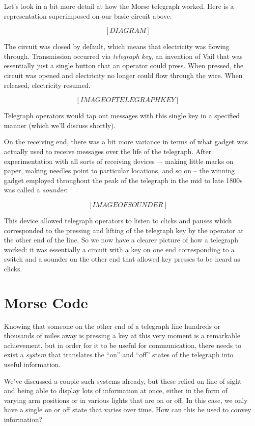 \documentclass{book}
\begin{document}
Let's look in a bit more detail at how the Morse telegraph worked. Here is a representation superimposed on our basic circuit above:

\[ [DIAGRAM] \]

The circuit was closed by default, which means that electricity was flowing through. Transmission occurred via \emph{telegraph key}, an invention of Vail that was essentially just a single button that an operator could press. When pressed, the circuit was opened and electricity no longer could flow through the wire. When released, electricity resumed.

\[ [IMAGE OF TELEGRAPH KEY] \]

Telegraph operators would tap out messages with this single key in a specified manner (which we'll discuss shortly).

On the receiving end, there was a bit more variance in terms of what gadget was actually used to receive messages over the life of the telegraph. After experimentation with all sorts of receiving devices –- making little marks on paper, making needles point to particular locations, and so on -- the winning gadget employed throughout the peak of the telegraph in the mid to late 1800s was called a \emph{sounder}:

\[ [IMAGE OF SOUNDER] \]

This device allowed telegraph operators to listen to clicks and pauses which corresponded to the pressing and lifting of the telegraph key by the operator at the other end of the line. So we now have a clearer picture of how a telegraph worked: it was essentially a circuit with a key on one end corresponding to a switch and a sounder on the other end that allowed key presses to be heard as clicks.

\section{Morse Code}

Knowing that someone on the other end of a telegraph line hundreds or thousands of miles away is pressing a key at this very moment is a remarkable achievement, but in order for it to be useful for communication, there needs to exist a \emph{system} that translates the ``on'' and ``off'' states of the telegraph into useful information.

We've discussed a couple such systems already, but these relied on line of sight and being able to display lots of information at once, either in the form of varying arm positions or in various lights that are on or off. In this case, we only have a single on or off state that varies over time. How can this be used to convey information?
\end{document}
